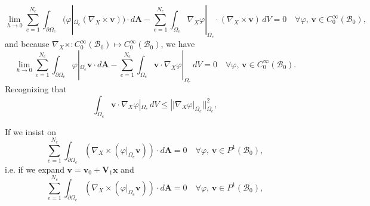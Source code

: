 \begin{equation}
	\lim_{h \rightarrow 0} \sum_{e = 1}^{N_e} \int_{\partial \Omega_e} (\varphi|_{\Omega_e} (\nabla_X \times \mathbf{v})) \cdot d\mathbf{A} - \sum_{e = 1}^{N_e} \int_{\Omega_e} \nabla_X \varphi|_{\Omega_e} \cdot (\nabla_X \times \mathbf{v}) \, dV = 0 \quad \forall \varphi, \, \mathbf{v} \in C^\infty_0 (\mathcal{B}_0),
\end{equation}
and because $\nabla_X \times : C^\infty_0 (\mathcal{B}_0) \mapsto C^\infty_0 (\mathcal{B}_0)$, we have
\begin{equation}
	\lim_{h \rightarrow 0} \sum_{e = 1}^{N_e} \int_{\partial \Omega_e} \varphi|_{\Omega_e} \mathbf{v} \cdot d\mathbf{A} - \sum_{e = 1}^{N_e} \int_{\Omega_e} \mathbf{v} \cdot \nabla_X \varphi|_{\Omega_e} \, dV = 0 \quad \forall \varphi, \, \mathbf{v} \in C^\infty_0 (\mathcal{B}_0).
\end{equation}
Recognizing that
\begin{equation}
	\int_{\Omega_e} \mathbf{v} \cdot \nabla_X \varphi|_{\Omega_e} \, dV \leq  || \nabla_X \varphi|_{\Omega_e} ||^2_{\Omega_e},
\end{equation}

If we insist on
\begin{equation}
	\sum_{e = 1}^{N_e} \int_{\partial \Omega_e} (\nabla_X \times (\varphi|_{\Omega_e} \mathbf{v})) \cdot d\mathbf{A} = 0 \quad \forall \varphi, \, \mathbf{v} \in P^1 (\mathcal{B}_0),
\end{equation}
i.e. if we expand $\mathbf{v} = \mathbf{v}_0 + \mathbf{V}_1 \mathbf{x}$ and 
\begin{equation}
	\sum_{e = 1}^{N_e} \int_{\partial \Omega_e} (\nabla_X \times (\varphi|_{\Omega_e} \mathbf{v})) \cdot d\mathbf{A} = 0 \quad \forall \varphi, \, \mathbf{v} \in P^1 (\mathcal{B}_0),
\end{equation}
